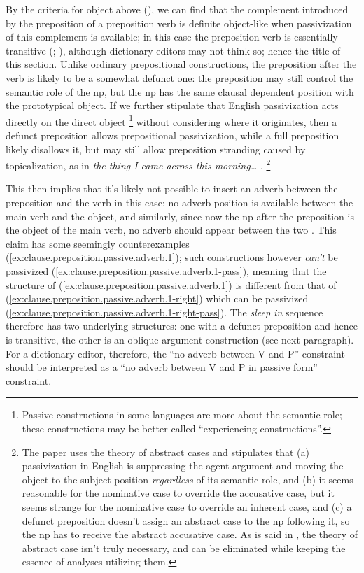 \documentclass[UTF8, a4paper, oneside, scheme=plain, 12pt]{ctexbook}
\newcommand*{\citepage}[1]{p.~{#1}}
\newcommand{\form}[1]{\emph{#1}}
\begin{document}
By the criteria for object above (),
we can find that the complement introduced by the preposition of a preposition verb 
is definite object-like
when passivization of this complement is available; 
in this case the preposition verb is essentially transitive
(\citealt[\citepage{291}, \citepage{297}]{dixon2005semantic};
\citealt[\citepage{277}]{cgel}),
although dictionary editors may not think so;
hence the title of this section.
Unlike ordinary prepositional constructions, 
the preposition after the verb 
is likely to be a somewhat defunct one: 
the preposition may still control the semantic role of the \acs{np}, 
but the \acs{np} has the same clausal dependent position with the prototypical object.
If we further stipulate that English passivization acts directly on the direct object%
\footnote{
    Passive constructions in some languages are more about the semantic role; 
    these constructions may be better called ``experiencing constructions''.
}
without considering where it originates,
then a defunct preposition allows prepositional passivization, 
while a full preposition likely disallows it, 
but may still allow preposition stranding caused by topicalization, 
as in \form{the thing I came across this morning\dots}
\citep{richards2017multiple}.%
\footnote{
    The paper uses the theory of abstract cases and stipulates that 
    (a) passivization in English is suppressing the agent argument and 
    moving the object to the subject position \emph{regardless} of its semantic role, and 
    (b) it seems reasonable for the nominative case to override the accusative case, 
    but it seems strange for the nominative case to override an inherent case, and 
    (c) a defunct preposition doesn't assign an abstract case to the \acs{np} following it, 
    so the \acs{np} has to receive the abstract accusative case.
    As is said in , 
    the theory of abstract case isn't truly necessary, 
    and can be eliminated while keeping the essence of analyses utilizing them.
}




This then implies that it's likely not possible to insert an adverb 
between the preposition and the verb in this case: 
no adverb position is available between the main verb and the object, 
and similarly, since now the \acs{np} after the preposition 
is the object of the main verb, 
no adverb should appear between the two \citep{richards2017multiple}.
This claim has some seemingly counterexamples (\ref{ex:clause.preposition.passive.adverb.1});
such constructions however \emph{can't} be passivized 
(\ref{ex:clause.preposition.passive.adverb.1-pass}), 
meaning that the structure of (\ref{ex:clause.preposition.passive.adverb.1})
is different from that of (\ref{ex:clause.preposition.passive.adverb.1-right})
which can be passivized (\ref{ex:clause.preposition.passive.adverb.1-right-pass}).
The \form{sleep in} sequence therefore has two underlying structures: 
one with a defunct preposition and hence is transitive, 
the other is an oblique argument construction (see next paragraph).
For a dictionary editor, therefore, 
the ``no adverb between V and P'' constraint 
should be interpreted as a ``no adverb between V and P in passive form'' constraint.
\end{document}
